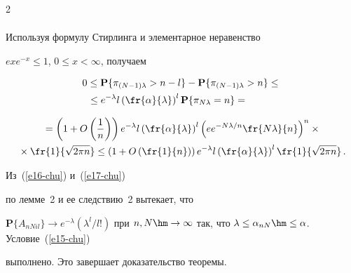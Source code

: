 \begin{multicols}{2}
\begin{multline}
\label{e16-chu}


\end{multline}


Используя формулу   Стирлинга и элементарное неравенство


$exe^{-x}\le 1$, $0\le x<\infty$, получаем


\begin{multline*}


0\le \mathbf{P}\{\pi_{(N-1)\lambda}>n-l\}-\mathbf{P}\{


\pi_{(N-1)\lambda}>n\}\le{}\\


{}\le


 e^{-\lambda} l\left(\fr{\alpha}{\lambda}\right)^l\mathbf{P}\{\pi_{N\lambda}=n\}={}\hspace*{10mm}


\end{multline*}


 


\noindent


\begin{multline}


{}=


\left(1+O\left(\frac{1}{n}\right)\right) e^{-\lambda}


l\left(\fr{\alpha}{\lambda}\right)^l\left(e


e^{-{N\lambda}/{n}}\fr{N\lambda}{n}\right)^n\times{}


\\


{}\times


\fr{1}{\sqrt{2\pi n}}\le


\left(1+O\left(\fr{1}{n}\right)\right)


e^{-\lambda} l\left(\fr{\alpha}{\lambda}\right)^l


\fr{1}{\sqrt{2\pi n}}\,. \label{e17-chu}


\end{multline}


Из~(\ref{e16-chu}) и~(\ref{e17-chu})


  по  лемме~2 и ее следствию~2 вытекает, что  


  $ \mathbf{P}\{A_{nNil}\}\to e^{-\lambda} ({\lambda^l}/{l!})$ при $n,


N\hm\to\infty$ так, что $\lambda\le\alpha_{nN}\hm\le\alpha$. Условие~(\ref{e15-chu})


выполнено. Это завершает доказательство теоремы.






\end{multicols}
